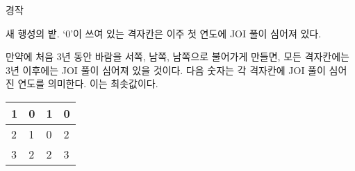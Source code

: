 \begin{problem}{경작}
\begin{center}
	새 행성의 밭. `0'이 쓰여 있는 격자칸은 이주 첫 연도에 JOI 풀이 심어져 있다.
	\end{center}
	
	만약에 처음 3년 동안 바람을 서쪽, 남쪽, 남쪽으로 불어가게 만들면, 모든 격자칸에는 3년 이후에는 JOI 풀이 심어져 있을 것이다. 다음 숫자는 각 격자칸에 JOI 풀이 심어진 연도를 의미한다. 이는 최솟값이다.
	
	\begin{center}
			\begin{tabular}{|l|l|l|l|}
		\hline
		1 & 0 &  1 & 0 \\ \hline
	2	&  1 & 0 &  2 \\ \hline
	3	& 2  & 2  &   3\\ \hline
	\end{tabular}
	\end{center}

	\begin{example}
	\end{example}
	
	
\end{problem}

